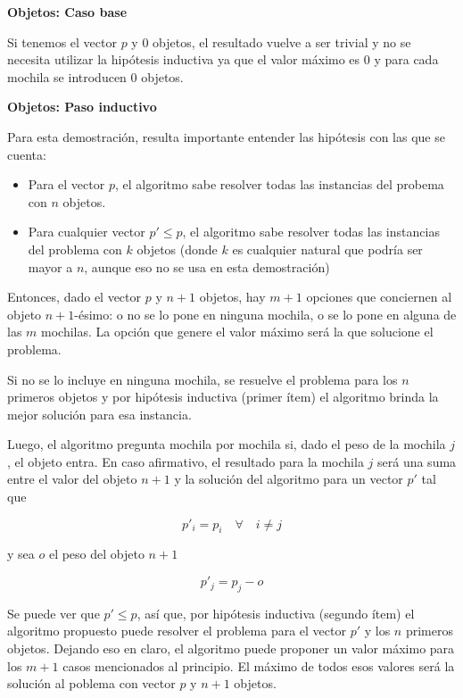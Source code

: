 \vspace{5mm}

{\large\textbf{Objetos: Caso base}}

\vspace{5mm}

Si tenemos el vector $p$ y $0$ objetos, el resultado vuelve a ser trivial y no se necesita utilizar la hipótesis inductiva ya que el valor máximo es $0$ y para cada mochila se introducen $0$ objetos.

\vspace{5mm}

{\large\textbf{Objetos: Paso inductivo}}

\vspace{5mm}

Para esta demostración, resulta importante entender las hipótesis con las que se cuenta:

\begin{itemize}
\item Para el vector $p$, el algoritmo sabe resolver todas las instancias del probema con $n$ objetos.
\item Para cualquier vector $p' \leq p$, el algoritmo sabe resolver todas las instancias del problema con $k$ objetos (donde $k$ es cualquier natural que podría ser mayor a $n$, aunque eso no se usa en esta demostración)
\end{itemize}

Entonces, dado el vector $p$ y $n + 1$ objetos, hay $m + 1$ opciones que conciernen al objeto $n + 1$-ésimo: o no se lo pone en ninguna mochila, o se lo pone en alguna de las $m$ mochilas. La opción que genere el valor máximo será la que solucione el problema.

Si no se lo incluye en ninguna mochila, se resuelve el problema para los $n$ primeros objetos y por hipótesis inductiva (primer ítem) el algoritmo brinda la mejor solución para esa instancia.

Luego, el algoritmo pregunta mochila por mochila si, dado el peso de la mochila $j$, el objeto entra. En caso afirmativo, el resultado para la mochila $j$ será una suma entre el valor del objeto $n + 1$ y la solución del algoritmo para un vector $p'$ tal que

$$p'_i = p_i \quad \forall \quad i \neq j$$

y sea $o$ el peso del objeto $n + 1$

$$p'_j = p_j - o$$

Se puede ver que $p' \leq p$, así que, por hipótesis inductiva (segundo ítem) el algoritmo propuesto puede resolver el problema para el vector $p'$ y los $n$ primeros objetos. Dejando eso en claro, el algoritmo puede proponer un valor máximo para los $m + 1$ casos mencionados al principio. El máximo de todos esos valores será la solución al poblema con vector $p$ y $n + 1$ objetos.

